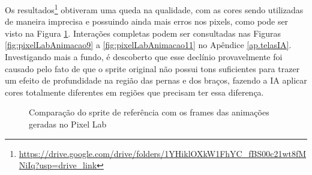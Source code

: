 Os resultados\footnote{\url{https://drive.google.com/drive/folders/1YHiklOXkW1FhYC_fBS00c21wt8fMNiIq?usp=drive_link}} obtiveram uma queda na qualidade, com as cores sendo utilizadas de maneira imprecisa e possuindo ainda mais erros nos pixels, como pode ser visto na Figura \ref{fig:pixelLabAnimaComparaGemini2}. Interações completas podem ser consultadas nas Figuras \ref{fig:pixelLabAnimacao9} a \ref{fig:pixelLabAnimacao11} no Apêndice \ref{ap.telasIA}. Investigando mais a fundo, é descoberto que esse declínio provavelmente foi causado pelo fato de que o sprite original não possui tons suficientes para trazer um efeito de profundidade na região das pernas e dos braços, fazendo a IA aplicar cores totalmente diferentes em regiões que precisam ter essa diferença.

\begin{figure}[htbp]
    \centering
    \caption{\small Comparação do sprite de referência com os frames das animações geradas no Pixel Lab}
    \label{fig:pixelLabAnimaComparaGemini2}


\end{figure}
